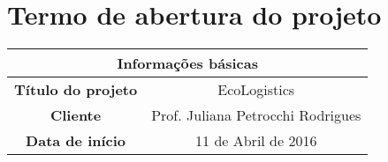 \chapter{Termo de abertura do projeto}
  \begin{table}[ht]
    \centering
    \begin{tabular}{| c | c |}
      \hline
      \multicolumn{2}{|c|}{Informações básicas} \\
      \hline
      \textbf{Título do projeto} & EcoLogistics \\
      \hline
      \textbf{Cliente} & Prof. Juliana Petrocchi Rodrigues \\
      \hline
      \textbf{Data de início} & 11 de Abril de 2016 \\
      \hline
    \end{tabular}
  \end{table}

  
  
  
  
  
  
  
  
  
  
  
  
